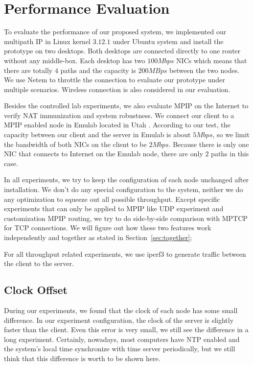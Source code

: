 \section{Performance Evaluation}
\label{sec:evaluation}

To evaluate the performance of our proposed system, we implemented our multipath IP in Linux kernel $3.12.1$ under Ubuntu system and install the prototype on two desktops. Both desktops are connected directly to one router without any middle-box. Each desktop has two $100Mbps$ NICs which means that there are totally $4$ paths and the capacity is $200MBps$ between the two nodes. We use Netem\cite{netem} to throttle the connection to evaluate our prototype under multiple scenarios. Wireless connection is also considered in our evaluation.

Besides the controlled lab experiments, we also evaluate MPIP on the Internet to verify NAT immunization and system robustness. We connect our client to a MPIP enabled node in Emulab\cite{emulab} located in Utah . According to our test, the capacity between our client and the server in Emulab is about $5Mbps$, so we limit the bandwidth of both NICs on the client to be $2Mbps$. Because there is only one NIC that connects to Internet on the Emulab node, there are only $2$ paths in this case.

In all experiments, we try to keep the configuration of each node unchanged after installation. We don't do any special configuration to the system, neither we do any optimization to squeeze out all possible throughput. Except specific experiments that can only be applied to MPIP like UDP experiment and customization MPIP routing, we try to do side-by-side comparison with MPTCP for TCP connections. We will figure out how these two features work independently and together as stated in Section~\ref{sec:together};

For all throughput related experiments, we use iperf3 to generate traffic between the client to the server.


\subsection{Clock Offset}
\label{sec:clock}

During our experiments, we found that the clock of each node has some small difference. In our experiment configuration, the clock of the server is slightly faster than the client. Even this error is very small, we still see the difference in a long experiment.
Certainly, nowadays, most computers have NTP enabled and the system's local time synchronize with time server periodically, but we still think that this difference is worth to be shown here.


